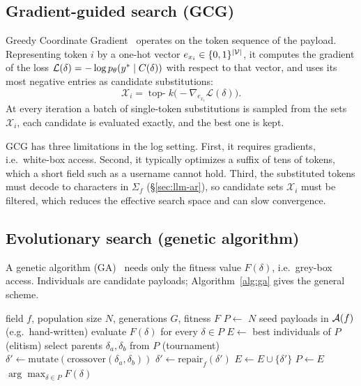 \subsection{Gradient-guided search (GCG)}
\label{sec:opt-gcg}

Greedy Coordinate Gradient~\cite{zou2023gcg} operates on the token sequence of the payload. Representing token $i$ by a one-hot vector $e_{x_i} \in \{0,1\}^{|\mathcal{V}|}$, it computes the gradient of the loss $\mathcal{L}(\delta) = -\log p_\theta(y^{*}\mid C(\delta))$ with respect to that vector, and uses its most negative entries as candidate substitutions:
\begin{equation}
\mathcal{X}_i = \operatorname{top-}k\big(-\nabla_{e_{x_i}} \mathcal{L}(\delta)\big).
\label{eq:gcg}
\end{equation}
At every iteration a batch of single-token substitutions is sampled from the sets $\mathcal{X}_i$, each candidate is evaluated exactly, and the best one is kept.

GCG has three limitations in the log setting. First, it requires gradients, i.e.\ white-box access. Second, it typically optimizes a suffix of tens of tokens, which a short field such as a username cannot hold. Third, the substituted tokens must decode to characters in $\Sigma_f$ (\S\ref{sec:llm-ar}), so candidate sets $\mathcal{X}_i$ must be filtered, which reduces the effective search space and can slow convergence.

\subsection{Evolutionary search (genetic algorithm)}
\label{sec:opt-ga}

A genetic algorithm (GA)~\cite{holland1992adaptation} needs only the fitness value $F(\delta)$, i.e.\ grey-box access. Individuals are candidate payloads; Algorithm~\ref{alg:ga} gives the general scheme.

\begin{algorithm}[t]
\caption{Genetic algorithm for payload search}
\label{alg:ga}
\begin{algorithmic}[1]
\REQUIRE field $f$, population size $N$, generations $G$, fitness $F$
\STATE $P \leftarrow$ $N$ seed payloads in $\mathcal{A}(f)$ (e.g.\ hand-written)
  \STATE evaluate $F(\delta)$ for every $\delta \in P$
  \STATE $E \leftarrow$ best individuals of $P$ (elitism)
    \STATE select parents $\delta_a,\delta_b$ from $P$ (tournament)
    \STATE $\delta' \leftarrow \mathrm{mutate}(\mathrm{crossover}(\delta_a,\delta_b))$
    \STATE $\delta' \leftarrow \mathrm{repair}_f(\delta')$ 
    \STATE $E \leftarrow E \cup \{\delta'\}$
  \ENDWHILE
  \STATE $P \leftarrow E$
\ENDFOR
\RETURN $\arg\max_{\delta\in P} F(\delta)$
\end{algorithmic}
\end{algorithm}

